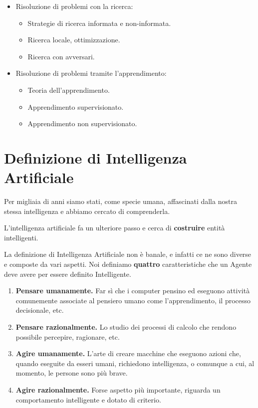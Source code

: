         \begin{itemize}
            \item Risoluzione di problemi con la ricerca:
            \begin{itemize}
                \item Strategie di ricerca informata e non-informata.
                \item Ricerca locale, ottimizzazione.
                \item Ricerca con avversari.
            \end{itemize}
            \item Risoluzione di problemi tramite l'apprendimento:
            \begin{itemize}
                \item Teoria dell'apprendimento.
                \item Apprendimento supervisionato.
                \item Apprendimento non supervisionato.
            \end{itemize}
        \end{itemize}
        
\section{Definizione di Intelligenza Artificiale}
    Per migliaia di anni siamo stati, come specie umana, affascinati dalla nostra stessa intelligenza e abbiamo cercato di comprenderla.
    
    L'intelligenza artificiale fa un ulteriore passo e cerca di \textbf{costruire} entità intelligenti.

    La definizione di Intelligenza Artificiale non è banale, e infatti ce ne sono diverse e composte da vari aspetti. Noi definiamo \textbf{quattro} caratteristiche che un Agente deve avere per essere definito Intelligente.
        
    \begin{enumerate}
        \item \textbf{Pensare umanamente.} Far sì che i computer pensino ed eseguono attività comunemente associate al pensiero umano come l'apprendimento, il processo decisionale, etc.
        \item \textbf{Pensare razionalmente.} Lo studio dei processi di calcolo che rendono possibile percepire, ragionare, etc.
        \item \textbf{Agire umanamente.} L'arte di creare macchine che eseguono azioni che, quando eseguite da esseri umani, richiedono intelligenza, o comunque a cui, al momento, le persone sono più brave.
        \item \textbf{Agire razionalmente.} Forse aspetto più importante, riguarda un comportamento intelligente e dotato di criterio.
    \end{enumerate}
        
